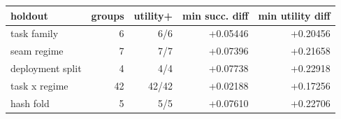 \begin{tabular}{lrrrr}
\toprule
holdout & groups & utility+ & min succ. diff & min utility diff \\
\midrule
task family & 6 & 6/6 & +0.05446 & +0.20456 \\
seam regime & 7 & 7/7 & +0.07396 & +0.21658 \\
deployment split & 4 & 4/4 & +0.07738 & +0.22918 \\
task x regime & 42 & 42/42 & +0.02188 & +0.17256 \\
hash fold & 5 & 5/5 & +0.07610 & +0.22706 \\
\bottomrule
\end{tabular}
